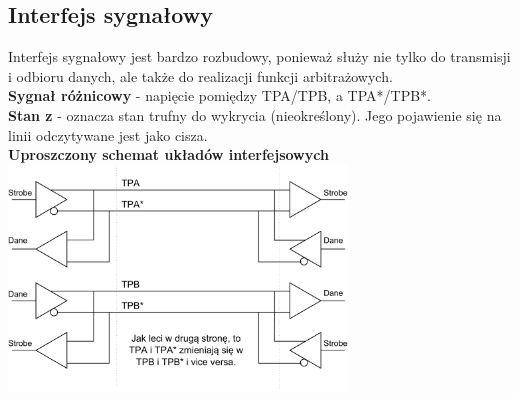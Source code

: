 \subsection{Interfejs sygnałowy}
Interfejs sygnałowy jest bardzo rozbudowy, ponieważ służy nie tylko do transmisji i odbioru danych, ale także do realizacji funkcji arbitrażowych.\\
\textbf{Sygnał różnicowy} - napięcie pomiędzy TPA/TPB, a TPA*/TPB*.\\
\textbf{Stan z} - oznacza stan trufny do wykrycia (nieokreślony). Jego pojawienie się na linii odczytywane jest jako cisza. \\

\textbf{Uproszczony schemat układów interfejsowych}\\
\includegraphics[width=9cm]{./wyklady/Rysunek01.pdf}

